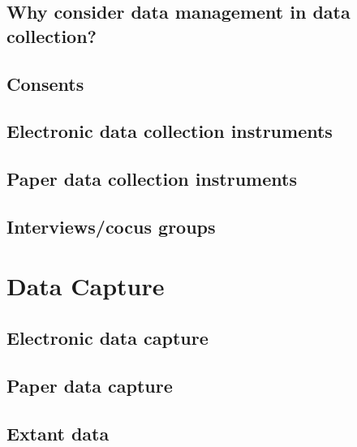 \documentclass[
]{book}
\begin{document}
\hypertarget{why-consider-data-management-in-data-collection}{%
\section{Why consider data management in data collection?}\label{why-consider-data-management-in-data-collection}}

\hypertarget{consents}{%
\section{Consents}\label{consents}}

\hypertarget{electronic-data-collection-instruments}{%
\section{Electronic data collection instruments}\label{electronic-data-collection-instruments}}

\hypertarget{paper-data-collection-instruments}{%
\section{Paper data collection instruments}\label{paper-data-collection-instruments}}

\hypertarget{interviewscocus-groups}{%
\section{Interviews/cocus groups}\label{interviewscocus-groups}}

\hypertarget{data-capture}{%
\chapter{Data Capture}\label{data-capture}}

\hypertarget{electronic-data-capture}{%
\section{Electronic data capture}\label{electronic-data-capture}}

\hypertarget{paper-data-capture}{%
\section{Paper data capture}\label{paper-data-capture}}

\hypertarget{extant-data}{%
\section{Extant data}\label{extant-data}}
\end{document}
